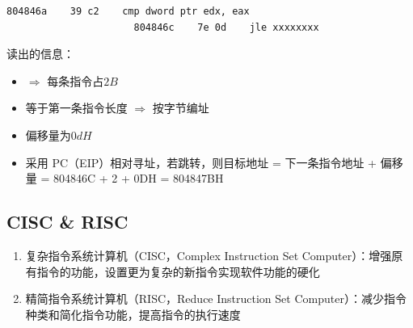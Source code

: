 \documentclass[./computer-organization-and-architecture.tex]{subfiles}
\begin{document}
\begin{enumerate}
\begin{analysisbox}
\begin{lstlisting}[language={[x86masm]Assembler}]
                      804846a    39 c2    cmp dword ptr edx, eax
                      804846c    7e 0d    jle xxxxxxxx
            \end{lstlisting}
            读出的信息：
            \begin{itemize}
                \item {} $\Rightarrow$ 每条指令占$2B$
                \item {} 等于第一条指令长度 $\Rightarrow$ 按字节编址
                \item {} 偏移量为$0dH$
                \item {} 采用 PC（EIP）相对寻址，若跳转，则目标地址 = 下一条指令地址 + 偏移量 = 804846C + 2 + 0DH = 804847BH
            \end{itemize}
        \end{analysisbox}
    \end{enumerate}

    \subsection{CISC \& RISC}

    \begin{enumerate}
        \item 复杂指令系统计算机（CISC，Complex Instruction Set Computer）：增强原有指令的功能，设置更为复杂的新指令实现软件功能的硬化
        \item 精简指令系统计算机（RISC，Reduce Instruction Set Computer）：减少指令种类和简化指令功能，提高指令的执行速度
    \end{enumerate}
\end{document}
